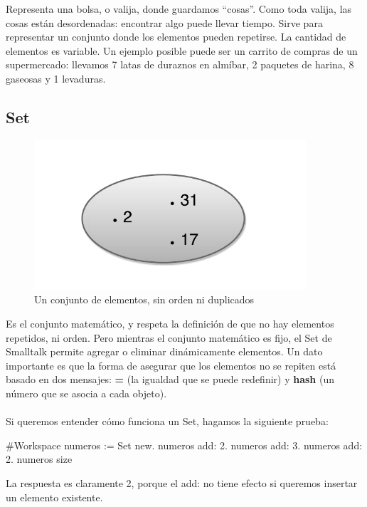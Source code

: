 \documentclass[a4paper,12pt]{book}
\begin{document}
Representa una bolsa, o valija, donde guardamos ``cosas''. Como toda valija, las cosas están desordenadas: 
encontrar algo puede llevar tiempo. Sirve para representar un conjunto donde los elementos pueden 
repetirse. La cantidad de elementos es variable. Un ejemplo posible puede ser un carrito de compras 
de un supermercado: llevamos 7 latas de duraznos en almíbar, 2 paquetes de harina, 8 gaseosas y 1 levaduras. 

\subsection{Set}

\begin{figure}[h!]
    \centering
    \includegraphics[width=0.9\textwidth]{images/40_Set.pdf}
    \caption{Un conjunto de elementos, sin orden ni duplicados}
\end{figure}
\FloatBarrier

Es el conjunto matemático, y respeta la definición de que no hay elementos repetidos, ni orden. Pero mientras
el conjunto matemático es fijo, el Set de Smalltalk permite agregar o eliminar dinámicamente elementos. 
Un dato importante es que la forma de asegurar que los elementos no se repiten está basado en dos mensajes:
\textbf{=} (la igualdad que se puede redefinir) y \textbf{hash} (un número que se asocia a cada objeto).
\\
\\
Si queremos entender cómo funciona un Set, hagamos la siguiente prueba:

\begin{code}
#Workspace
numeros := Set new.
numeros add: 2.
numeros add: 3.
numeros add: 2.
numeros size
\end{code}

La respuesta es claramente 2, porque el add: no tiene efecto si queremos insertar un elemento existente.
\end{document}
